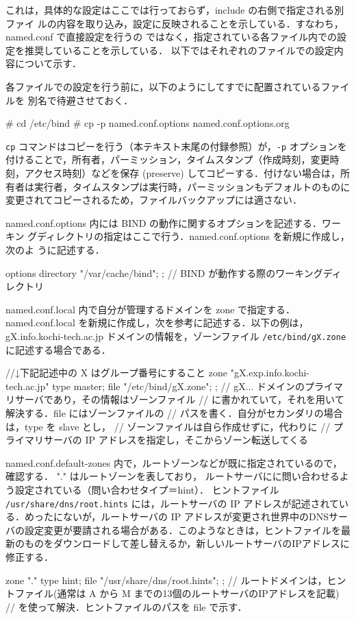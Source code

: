 これは，具体的な設定はここでは行っておらず，include の右側で指定される別ファイ
ルの内容を取り込み，設定に反映されることを示している．すなわち，named.conf で直接設定を行うの
ではなく，指定されている各ファイル内での設定を推奨していることを示している．
以下ではそれぞれのファイルでの設定内容について示す．

各ファイルでの設定を行う前に，以下のようにしてすでに配置されているファイルを
別名で待避させておく．
\begin{cli}
# cd /etc/bind
# cp -p named.conf.options named.conf.options.org
\end{cli}

\texttt{cp} コマンドはコピーを行う（本テキスト末尾の付録参照）が，\texttt{-p} オプションを付けることで，所有者，パーミッション，タイムスタンプ（作成時刻，変更時刻，アクセス時刻）などを保存 (preserve) してコピーする．付けない場合は，所有者は実行者，タイムスタンプは実行時，パーミッションもデフォルトのものに変更されてコピーされるため，ファイルバックアップには適さない．

named.conf.options 内には BIND の動作に関するオプションを記述する．ワーキン
グディレクトリの指定はここで行う．named.conf.options を新規に作成し，次のよ
うに記述する．
\begin{cli}
options {
    directory    "/var/cache/bind";
};
// BIND が動作する際のワーキングディレクトリ
\end{cli}

named.conf.local 内で自分が管理するドメインを zone で指定する．named.conf.local 
を新規に作成し，次を参考に記述する．以下の例は，gX.info.kochi-tech.ac.jp 
ドメインの情報を，ゾーンファイル \texttt{/etc/bind/gX.zone} に記述する場合である．
\begin{cli}
//↓下記記述中の X はグループ番号にすること
zone    "gX.exp.info.kochi-tech.ac.jp" {
    type    master;
    file    "/etc/bind/gX.zone";
};
// gX... ドメインのプライマリサーバであり，その情報はゾーンファイル
// に書かれていて，それを用いて解決する．file にはゾーンファイルの
// パスを書く．自分がセカンダリの場合は，type を slave とし，
// ゾーンファイルは自ら作成せずに，代わりに
// プライマリサーバの IP アドレスを指定し，そこからゾーン転送してくる
\end{cli}

named.conf.default-zones 内で，ルートゾーンなどが既に指定されているので，確認する．
"." はルートゾーンを表しており，
ルートサーバにに問い合わせるよう設定されている（問い合わせタイプ＝hint）．
ヒントファイル \texttt{/usr/share/dns/root.hints} には，ルートサーバの IP アドレスが記述されている．めったにないが，ルートサーバの IP アドレスが変更され世界中のDNSサーバの設定変更が要請される場合がある．このようなときは，ヒントファイルを最新のものをダウンロードして差し替えるか，新しいルートサーバのIPアドレスに修正する．
\begin{cli}
zone "." {
    type    hint;
    file    "/usr/share/dns/root.hints";
};
// ルートドメインは，ヒントファイル(通常は A から M までの13個のルートサーバのIPアドレスを記載)
// を使って解決．ヒントファイルのパスを file で示す．
\end{cli}

